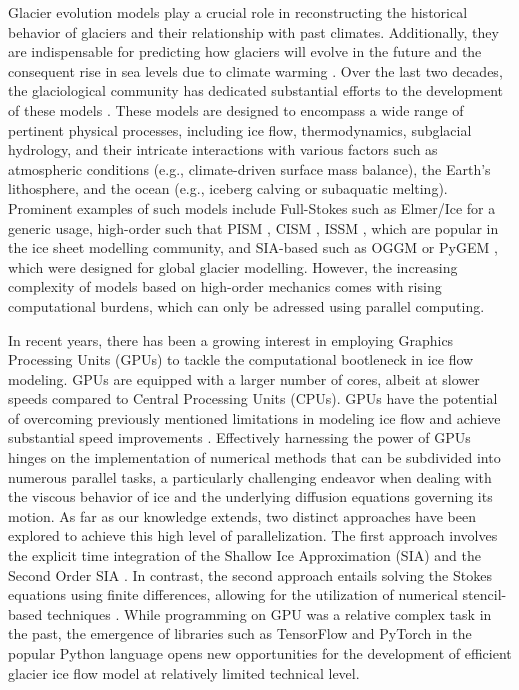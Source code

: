 \documentclass[10pt,twocolumn]{article}
\begin{document}
Glacier evolution models play a crucial role in reconstructing the historical behavior
of glaciers and their relationship with past climates. Additionally, they are indispensable 
for predicting how glaciers will evolve in the future and the consequent rise in sea levels
 due to climate warming \citep{pattyn2018paradigm}.
Over the last two decades, the glaciological community has dedicated substantial efforts to 
the development of these models \citep{zekollari2022ice}. 
These models are designed to encompass a wide range of 
pertinent physical processes, including ice flow, thermodynamics, subglacial hydrology, 
and their intricate interactions with various factors such as atmospheric conditions 
(e.g., climate-driven surface mass balance), the Earth's lithosphere, and the ocean 
(e.g., iceberg calving or subaquatic melting). Prominent examples of such models include 
Full-Stokes such as Elmer/Ice \citep{Gagliardini.etal.2013} for a generic
usage, high-order such that PISM \citep{Winkelmann2011}, CISM \citep{lipscomb2019description}, 
ISSM \citep{larour2012continental}, which are popular in the ice sheet modelling community,
and SIA-based such as OGGM \citep{maussion2019open} or PyGEM \citep{rounce2020glacier}, 
which were designed for global glacier modelling.
However, the increasing complexity of models based on high-order mechanics comes with 
rising computational burdens, which can only be adressed using parallel computing.

In recent years, there has been a growing interest in employing Graphics Processing Units 
(GPUs) to tackle the computational bootleneck in ice flow modeling. 
GPUs are equipped with a larger number of cores, albeit 
at slower speeds compared to Central Processing Units (CPUs). 
GPUs have the potential of overcoming previously mentioned limitations in modeling ice flow 
and achieve substantial speed improvements \citep{rass2020modelling}.
Effectively harnessing the power of GPUs hinges on the implementation of numerical methods 
that can be subdivided into numerous parallel tasks, a particularly challenging endeavor 
when dealing with the viscous behavior of ice and the underlying diffusion equations 
governing its motion. As far as our knowledge extends, two distinct approaches have
been explored to achieve this high level of parallelization. The first approach 
involves the explicit time integration of the Shallow Ice Approximation (SIA) 
\citep{vivsnjevic2020climatic} and the Second Order SIA \citep{braedstrup2014ice}. 
In contrast, the second approach entails solving the Stokes equations using finite differences, 
allowing for the utilization of numerical stencil-based techniques \citep{rass2020modelling}.
While programming on GPU was a relative complex task in the past, the emergence of libraries 
such as TensorFlow and PyTorch in the popular Python language opens new opportunities
for the development of efficient glacier ice flow model at relatively limited technical level.
 
\end{document}
